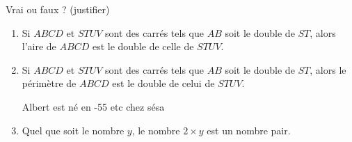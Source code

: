 
\begin{exercice}\label{exo2smath-0324}

    Vrai ou faux ? (justifier)
    \begin{enumerate}
        \item
            Si \( ABCD\) et \( STUV\) sont des carrés tels que \( AB\) soit le double de \( ST\), alors l'aire de \( ABCD\) est le double de celle de \( STUV\).
        \item
            Si \( ABCD\) et \( STUV\) sont des carrés tels que \( AB\) soit le double de \( ST\), alors le périmètre de \( ABCD\) est le double de celui de \( STUV\).


\kmldskfmldskfmlsdkml


Albert est né en -55 etc chez sésa

        \item
            Quel que soit le nombre \( y\), le nombre \( 2\times y\)  est un nombre pair.
    \end{enumerate}

\end{exercice}
